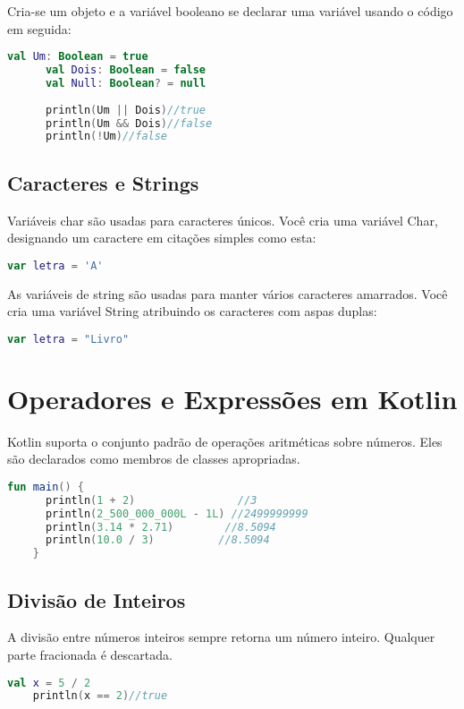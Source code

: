       Cria-se um objeto e a 
      variável booleano se declarar uma variável usando o 
      código em seguida:
      \begin{lstlisting}[label={lst:example1}, language=Kotlin]
      val Um: Boolean = true
      val Dois: Boolean = false
      val Null: Boolean? = null
      
      println(Um || Dois)//true
      println(Um && Dois)//false
      println(!Um)//false
      \end{lstlisting}

      \subsection{Caracteres e Strings}
      Variáveis char são usadas para caracteres únicos. 
      Você cria uma variável Char, designando um caractere 
      em citações simples como esta:
      \begin{lstlisting}[label={lst:example1}, language=Kotlin]
        var letra = 'A'
      \end{lstlisting}
      As variáveis de string são usadas para manter
      vários caracteres amarrados. Você cria uma 
      variável String atribuindo os caracteres 
      com aspas duplas:
      \begin{lstlisting}[label={lst:example1}, language=Kotlin]
        var letra = "Livro"
      \end{lstlisting}


    \section{Operadores e Express\~{o}es em Kotlin}
    Kotlin suporta o conjunto padrão de operações 
    aritméticas sobre números. Eles são declarados 
    como membros de classes apropriadas.
    \begin{lstlisting}[label={lst:example1}, language=Kotlin]
    fun main() {
      println(1 + 2)                //3
      println(2_500_000_000L - 1L) //2499999999
      println(3.14 * 2.71)        //8.5094
      println(10.0 / 3)          //8.5094
    }
    \end{lstlisting}

    \subsection{Divisão de Inteiros}
    A divisão entre números inteiros sempre 
    retorna um número inteiro. Qualquer 
    parte fracionada é descartada.
    \begin{lstlisting}[label={lst:example1}, language=Kotlin]
    val x = 5 / 2
    println(x == 2)//true
    \end{lstlisting}

